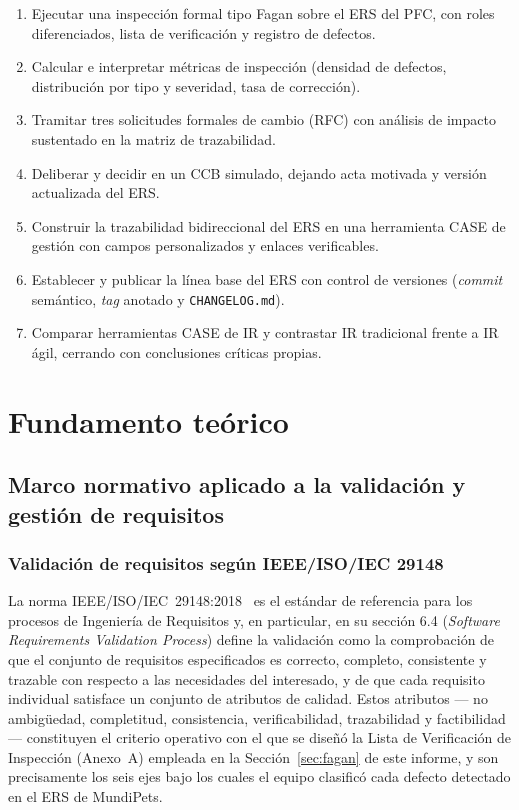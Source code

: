 \documentclass[journal,onecolumn]{IEEEtran}
\begin{document}
	\begin{enumerate}[label=\arabic*.]
		\item Ejecutar una inspección formal tipo Fagan sobre el ERS del
		PFC, con roles diferenciados, lista de verificación y registro
		de defectos.
		\item Calcular e interpretar métricas de inspección (densidad
		de defectos, distribución por tipo y severidad, tasa de
		corrección).
		\item Tramitar tres solicitudes formales de cambio (RFC) con
		análisis de impacto sustentado en la matriz de trazabilidad.
		\item Deliberar y decidir en un CCB simulado, dejando acta
		motivada y versión actualizada del ERS.
		\item Construir la trazabilidad bidireccional del ERS en una
		herramienta CASE de gestión con campos personalizados y
		enlaces verificables.
		\item Establecer y publicar la línea base del ERS con control
		de versiones (\emph{commit} semántico, \emph{tag} anotado y
		\texttt{CHANGELOG.md}).
		\item Comparar herramientas CASE de IR y contrastar IR
		tradicional frente a IR ágil, cerrando con conclusiones
		críticas propias.
	\end{enumerate}
	
	\section{Fundamento teórico}
	\label{sec:fundamento}
	
	\subsection{Marco normativo aplicado a la validación y gestión de requisitos}
	\label{sec:marco-normativo}
	
	\subsubsection{Validación de requisitos según IEEE/ISO/IEC 29148}
	
	La norma IEEE/ISO/IEC~29148:2018~\cite{ieee29148_2018} es el estándar
	de referencia para los procesos de Ingeniería de Requisitos y, en
	particular, en su sección 6.4 (\emph{Software Requirements
		Validation Process}) define la validación como la comprobación de
	que el conjunto de requisitos especificados es correcto, completo,
	consistente y trazable con respecto a las necesidades del
	interesado, y de que cada requisito individual satisface un
	conjunto de atributos de calidad. Estos atributos --- no
	ambigüedad, completitud, consistencia, verificabilidad,
	trazabilidad y factibilidad --- constituyen el criterio operativo
	con el que se diseñó la Lista de Verificación de Inspección
	(Anexo~A) empleada en la Sección~\ref{sec:fagan} de este informe, y
	son precisamente los seis ejes bajo los cuales el equipo clasificó
	cada defecto detectado en el ERS de MundiPets.
	
\end{document}
